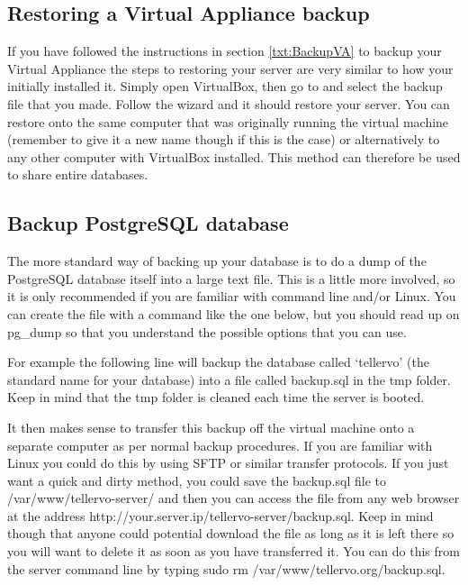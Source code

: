 \subsection{Restoring a Virtual Appliance backup}
If you have followed the instructions in section \ref{txt:BackupVA} to backup your Virtual Appliance the steps to restoring your server are very similar to how your initially installed it.  Simply open VirtualBox, then go to  and select the backup file that you made.  Follow the wizard and it should restore your server.  You can restore onto the same computer that was originally running the virtual machine (remember to give it a new name though if this is the case) or alternatively to any other computer with VirtualBox installed.  This method can therefore be used to share entire databases.


\subsection{Backup PostgreSQL database}
The more standard way of backing up your database is to do a dump of the PostgreSQL database itself into a large text file.  This is a little more involved, so it is only recommended if you are familiar with command line and/or Linux.  You can create the file with a command like the one below, but you should read up on pg\_dump so that you understand the possible options that you can use.


For example the following line will backup the database called `tellervo' (the standard name for your database) into a file called backup.sql in the tmp folder.  Keep in mind that the tmp folder is cleaned each time the server is booted.


It then makes sense to transfer this backup off the virtual machine onto a separate computer as per normal backup procedures.  If you are familiar with Linux you could do this by using SFTP or similar transfer protocols.  If you just want a quick and dirty method, you could save the backup.sql file to /var/www/tellervo-server/ and then you can access the file from any web browser at the address http://your.server.ip/tellervo-server/backup.sql.  Keep in mind though that anyone could potential download the file as long as it is left there so you will want to delete it as soon as you have transferred it.  You can do this from the server command line by typing sudo rm /var/www/tellervo.org/backup.sql.  


